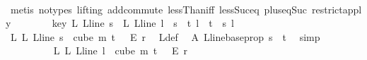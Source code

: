 \begin{isabellebody}
\ \ \ \ \ \ \ \ \isamarkupfalse%
\ {\isacharparenleft}{\kern0pt}metis\ {\isacharparenleft}{\kern0pt}no{\isacharunderscore}{\kern0pt}types{\isacharcomma}{\kern0pt}\ lifting{\isacharparenright}{\kern0pt}\ add{\isachardot}{\kern0pt}commute\ lessThan{\isacharunderscore}{\kern0pt}iff\ less{\isacharunderscore}{\kern0pt}Suc{\isacharunderscore}{\kern0pt}eq\ plus{\isacharunderscore}{\kern0pt}{}{\isacharunderscore}{\kern0pt}eq{\isacharunderscore}{\kern0pt}Suc\ restrict{\isacharunderscore}{\kern0pt}apply{\isacharparenright}{\kern0pt}\isanewline
\ \ \ \ \ \ \isamarkupfalse%
\ key{\isacharcolon}{\kern0pt}\ {\isachardoublequoteopen}{\isasymchi}L\ {\isacharparenleft}{\kern0pt}L{\isacharunderscore}{\kern0pt}line\ s{\isacharparenright}{\kern0pt}\ {\isacharequal}{\kern0pt}\ {\isasymchi}L\ {\isacharparenleft}{\kern0pt}L{\isacharunderscore}{\kern0pt}line\ l{\isacharparenright}{\kern0pt}{\isachardoublequoteclose}\ \ {\isachardoublequoteopen}s\ {\isacharless}{\kern0pt}\ t{\isachardoublequoteclose}\ {\isachardoublequoteopen}l\ {\isacharless}{\kern0pt}\ t{\isachardoublequoteclose}\ \ s\ l\isanewline
\ \ \ \ \ \ \isamarkupfalse%
{\isacharminus}{\kern0pt}\isanewline
\ \ \ \ \ \ \ \ \isamarkupfalse%
\ L{}{\isacharcolon}{\kern0pt}\ {\isachardoublequoteopen}{\isasymchi}L\ {\isacharparenleft}{\kern0pt}L{\isacharunderscore}{\kern0pt}line\ s{\isacharparenright}{\kern0pt}\ {\isasymin}\ cube\ m\ {\isacharparenleft}{\kern0pt}t\ {\isacharplus}{\kern0pt}\ {}{\isacharparenright}{\kern0pt}\ {\isasymrightarrow}\isactrlsub E\ {\isacharbraceleft}{\kern0pt}{\isachardot}{\kern0pt}{\isachardot}{\kern0pt}{\isacharless}{\kern0pt}r{\isacharbraceright}{\kern0pt}{\isachardoublequoteclose}\ \isamarkupfalse%
\ {\isasymchi}L{\isacharunderscore}{\kern0pt}def\ \isamarkupfalse%
\ A\ L{\isacharunderscore}{\kern0pt}line{\isacharunderscore}{\kern0pt}base{\isacharunderscore}{\kern0pt}prop\ {\isacartoucheopen}s\ {\isacharless}{\kern0pt}\ t{\isacartoucheclose}\ \isamarkupfalse%
\ simp\isanewline
\ \ \ \ \ \ \ \ \isamarkupfalse%
\ L{}{\isacharcolon}{\kern0pt}\ {\isachardoublequoteopen}{\isasymchi}L\ {\isacharparenleft}{\kern0pt}L{\isacharunderscore}{\kern0pt}line\ l{\isacharparenright}{\kern0pt}\ {\isasymin}\ cube\ m\ {\isacharparenleft}{\kern0pt}t\ {\isacharplus}{\kern0pt}\ {}{\isacharparenright}{\kern0pt}\ {\isasymrightarrow}\isactrlsub E\ {\isacharbraceleft}{\kern0pt}{\isachardot}{\kern0pt}{\isachardot}{\kern0pt}{\isacharless}{\kern0pt}r{\isacharbraceright}{\kern0pt}{\isachardoublequoteclose}\ \isamarkupfalse%

\end{isabellebody}
